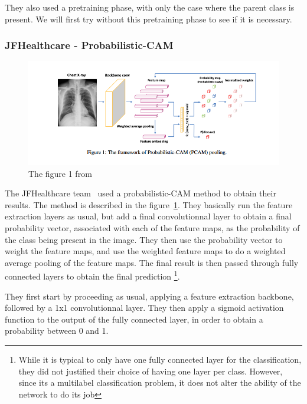 \documentclass[11pt]{article}
\begin{document}
            They also used a pretraining phase, with only the case where the parent class is present. We will first try without this pretraining phase to see if it is necessary.



        \subsubsection{JFHealthcare - Probabilistic-CAM~\cite{jfhealthcare}}

            \begin{figure}[H]

                 \centering
                 \includegraphics[width=0.8 \textwidth]{plots/jfhealthcare}
                 \caption{The figure 1 from~\cite{jfhealthcare}}
                 \label{fig:jfhealthcare_probabilistic_cam}

            \end{figure}

            The JFHealthcare team~\cite{jfhealthcare} used a probabilistic-CAM method to obtain their results.
             The method is described in the figure~\ref{fig:jfhealthcare_probabilistic_cam}. They basically run the feature extraction layers as usual, but add a final convolutionnal layer
            to obtain a final probability vector, associated with each of the feature maps, as the probability of the class being present in the image. They then use the probability vector to weight the feature maps, and use the weighted feature maps to do a
            weighted average pooling of the feature maps. The final result is then passed through fully connected layers to obtain the final prediction \footnote{While it is typical to only have one fully connected layer for the classification,
            they did not justified their choice of having one layer per class. However, since its a multilabel classification problem, it does not alter the ability of the network to do its job}.

            They first start by proceeding as usual, applying a feature extraction backbone, followed by a 1x1 convolutionnal layer.
            They then apply a sigmoid activation function to the output of the fully connected layer, in order to obtain a probability between 0 and 1.
\end{document}
